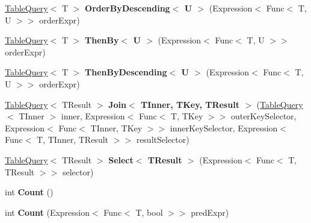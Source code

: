 \begin{DoxyCompactItemize}
\item 
\hypertarget{classSQLite_1_1TableQuery_aacf40c5e9162c7f25ebdb78a2811aec9}{}\hyperlink{classSQLite_1_1TableQuery}{Table\+Query}$<$ T $>$ {\bfseries Order\+By\+Descending$<$ U $>$} (Expression$<$ Func$<$ T, U $>$$>$ order\+Expr)\label{classSQLite_1_1TableQuery_aacf40c5e9162c7f25ebdb78a2811aec9}

\item 
\hypertarget{classSQLite_1_1TableQuery_a8fd46c541dda61605ecdcada1684b9b7}{}\hyperlink{classSQLite_1_1TableQuery}{Table\+Query}$<$ T $>$ {\bfseries Then\+By$<$ U $>$} (Expression$<$ Func$<$ T, U $>$$>$ order\+Expr)\label{classSQLite_1_1TableQuery_a8fd46c541dda61605ecdcada1684b9b7}

\item 
\hypertarget{classSQLite_1_1TableQuery_a589fb8db3bbfe57b0f08aeea32e574ee}{}\hyperlink{classSQLite_1_1TableQuery}{Table\+Query}$<$ T $>$ {\bfseries Then\+By\+Descending$<$ U $>$} (Expression$<$ Func$<$ T, U $>$$>$ order\+Expr)\label{classSQLite_1_1TableQuery_a589fb8db3bbfe57b0f08aeea32e574ee}

\item 
\hypertarget{classSQLite_1_1TableQuery_a292ef3b90067c4393cf377c369d942a1}{}\hyperlink{classSQLite_1_1TableQuery}{Table\+Query}$<$ T\+Result $>$ {\bfseries Join$<$ T\+Inner, T\+Key, T\+Result $>$} (\hyperlink{classSQLite_1_1TableQuery}{Table\+Query}$<$ T\+Inner $>$ inner, Expression$<$ Func$<$ T, T\+Key $>$$>$ outer\+Key\+Selector, Expression$<$ Func$<$ T\+Inner, T\+Key $>$$>$ inner\+Key\+Selector, Expression$<$ Func$<$ T, T\+Inner, T\+Result $>$$>$ result\+Selector)\label{classSQLite_1_1TableQuery_a292ef3b90067c4393cf377c369d942a1}

\item 
\hypertarget{classSQLite_1_1TableQuery_a3726c9bfa1bb9a0efa35f847a3d9d77e}{}\hyperlink{classSQLite_1_1TableQuery}{Table\+Query}$<$ T\+Result $>$ {\bfseries Select$<$ T\+Result $>$} (Expression$<$ Func$<$ T, T\+Result $>$$>$ selector)\label{classSQLite_1_1TableQuery_a3726c9bfa1bb9a0efa35f847a3d9d77e}

\item 
\hypertarget{classSQLite_1_1TableQuery_afc74d6d1b8ca720c3a26d6a0c0ca6b86}{}int {\bfseries Count} ()\label{classSQLite_1_1TableQuery_afc74d6d1b8ca720c3a26d6a0c0ca6b86}

\item 
\hypertarget{classSQLite_1_1TableQuery_abe589a906a2c592fc25587d441acca33}{}int {\bfseries Count} (Expression$<$ Func$<$ T, bool $>$$>$ pred\+Expr)\label{classSQLite_1_1TableQuery_abe589a906a2c592fc25587d441acca33}


\end{DoxyCompactItemize}
